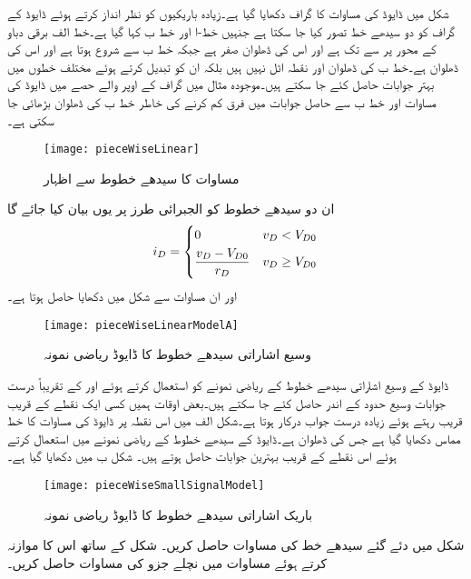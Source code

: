 شکل  میں ڈایوڈ کی مساوات کا گراف دکھایا گیا ہے۔زیادہ باریکیوں کو نظر انداز کرتے ہوئے ڈایوڈ کے گراف کو دو سیدھے خط تصور کیا جا سکتا ہے جنہیں خط-ا اور خط  ب کہا گیا ہے۔خط  الف برقی دباو کے محور پر    سے    تک ہے اور اس کی ڈھلوان صفر ہے جبکہ خط  ب    سے شروع ہوتا ہے اور اس کی ڈھلوان   ہے۔خط  ب کی ڈھلوان اور نقطہ   اٹل نہیں ہیں بلکہ ان کو تبدیل کرتے ہوئے مختلف خطوں میں بہتر جوابات حاصل کئے جا سکتے ہیں۔موجودہ مثال میں گراف کے اوپر والے حصے میں ڈایوڈ کی مساوات اور خط  ب سے حاصل جوابات میں فرق کم کرنے کی خاطر خط  ب کی ڈھلوان بڑھائی جا سکتی ہے۔
\begin{figure}
\centering
\texttt{[image: pieceWiseLinear]}
\caption{مساوات کا سیدھے خطوط سے اظہار}
\label{شکل_مساوات_کا_سیدھے_خطوط_سے_اظہار}
\end{figure}
ان دو سیدھے خطوط کو الجبرائی طرز پر یوں بیان کیا جائے گا
\begin{align} \label{مساوات_ڈایوڈ_سیدھے_خطوط}
i_D=
\begin{dcases}
0 & v_D < V_{D0}  \\
\frac{v_D-V_{D0}}{r_D} & v_D \geq V_{D0} 
\end{dcases}
\end{align}
اور ان مساوات سے شکل   میں دکھایا   حاصل ہوتا ہے۔
\begin{figure}
\centering
\texttt{[image: pieceWiseLinearModelA]}
\caption{وسیع اشاراتی سیدھے خطوط کا ڈایوڈ ریاضی نمونہ}
\label{شکل_سیدھے_خطوط_کا_ماڈل}
\end{figure}
ڈایوڈ کے وسیع اشاراتی سیدھے خطوط کے ریاضی نمونے کو استعمال کرتے ہوئے  اور  کے تقریباً درست جوابات وسیع حدود کے اندر حاصل کئے جا سکتے ہیں۔بعض اوقات ہمیں کسی ایک نقطے کے قریب قریب رہتے ہوئے زیادہ درست جواب درکار ہوتا ہے۔شکل  الف میں اس نقطہ  پر ڈایوڈ کی مساوات کا خط مماس دکھایا گیا ہے جس کی ڈھلوان  ہے۔ڈایوڈ کے سیدھے خطوط کے ریاضی نمونے میں  استعمال کرتے ہوئے اس نقطے کے قریب بہترین جوابات حاصل ہوتے ہیں۔ شکل  ب میں دکھایا گیا ہے۔
\begin{figure}
\centering
\texttt{[image: pieceWiseSmallSignalModel]}
\caption{باریک اشاراتی سیدھے خطوط کا ڈایوڈ ریاضی نمونہ}
\label{شکل_باریک_اشاراتی_سیدھے_خطوط_کا_ماڈل}
\end{figure}
  
شکل   میں دئے گئے سیدھے خط کی مساوات حاصل کریں۔ شکل   کے ساتھ اس کا موازنہ کرتے ہوئے مساوات   میں نچلے جزو کی مساوات حاصل کریں۔

